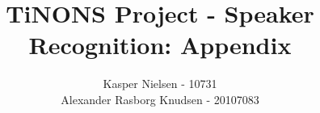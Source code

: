 \documentclass[]{report}
\title{TiNONS Project - Speaker Recognition: Appendix}
\author{Kasper Nielsen - 10731 \\ Alexander Rasborg Knudsen - 20107083}
\begin{document}
\maketitle

\listoffixmes
\newpage

\tableofcontents














\end{document}
